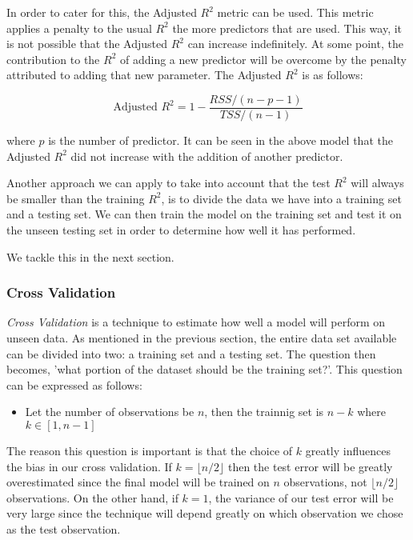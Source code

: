 \documentclass[11pt]{article}
\providecommand{\tightlist}{%
      \setlength{\itemsep}{0pt}\setlength{\parskip}{0pt}}
\begin{document}
In order to cater for this, the Adjusted \(R^2\) metric can be used.
This metric applies a penalty to the usual \(R^2\) the more predictors
that are used. This way, it is not possible that the Adjusted \(R^2\)
can increase indefinitely. At some point, the contribution to the
\(R^2\) of adding a new predictor will be overcome by the penalty
attributed to adding that new parameter. The Adjusted \(R^2\) is as
follows:

\[ \text{Adjusted }R^2 = 1 - \frac{ RSS/(n - p - 1) }{ TSS/(n - 1) } \]

where \(p\) is the number of predictor. It can be seen in the above
model that the Adjusted \(R^2\) did not increase with the addition of
another predictor.

Another approach we can apply to take into account that the test \(R^2\)
will always be smaller than the training \(R^2\), is to divide the data
we have into a training set and a testing set. We can then train the
model on the training set and test it on the unseen testing set in order
to determine how well it has performed.

We tackle this in the next section.

    \subsubsection{Cross Validation}\label{cross-validation}

    \emph{Cross Validation} is a technique to estimate how well a model will
perform on unseen data. As mentioned in the previous section, the entire
data set available can be divided into two: a training set and a testing
set. The question then becomes, 'what portion of the dataset should be
the training set?'. This question can be expressed as follows:

\begin{itemize}
\tightlist
\item
  Let the number of observations be \(n\), then the trainnig set is
  \(n-k\) where \(k \in [1,n-1]\)
\end{itemize}

The reason this question is important is that the choice of \(k\)
greatly influences the bias in our cross validation. If
\(k = \lfloor n/2 \rfloor\) then the test error will be greatly
overestimated since the final model will be trained on \(n\)
observations, not \(\lfloor n/2 \rfloor\) observations. On the other
hand, if \(k=1\), the variance of our test error will be very large
since the technique will depend greatly on which observation we chose as
the test observation.
\end{document}
